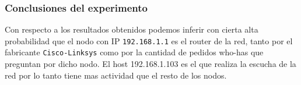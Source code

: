 \subsubsection{Conclusiones del experimento}
Con respecto a los resultados obtenidos podemos inferir con cierta alta probabilidad que el nodo con IP \texttt{192.168.1.1} es el router de la red, tanto por el fabricante \texttt{Cisco-Linksys} como por la cantidad de pedidos who-has que preguntan por dicho nodo. El host 192.168.1.103 es el que realiza la escucha de la red por lo tanto tiene mas actividad que el resto de los nodos.